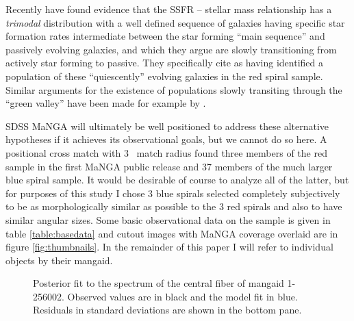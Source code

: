 \documentclass[modern]{aastex62}
\begin{document}
Recently \citet{2016arXiv161105932O} have found evidence that the SSFR -- stellar mass relationship has a \emph{trimodal} distribution with a well defined sequence of galaxies having specific star formation rates intermediate between the star forming ``main sequence'' and passively evolving galaxies, and which they argue are slowly transitioning from actively star forming to passive. They specifically cite  as having identified a population of these ``quiescently'' evolving galaxies in the red spiral sample. Similar arguments for the existence of populations slowly transiting through the ``green valley'' have been made for example by \citet{2015MNRAS.450..435S}.

SDSS MaNGA will ultimately be well positioned to address these alternative hypotheses if it achieves its observational goals, but we cannot do so here. A positional cross match with 3\arcsec~ match radius found three members of the red sample in the first MaNGA public release and 37 members of the much larger blue spiral sample. It would be desirable of course to analyze all of the latter, but for purposes of this study I chose 3 blue spirals selected completely subjectively to be as morphologically similar as possible to the 3 red spirals and also to have similar angular sizes. Some basic observational data on the sample is given in table \ref{table:basedata} and cutout images with MaNGA coverage overlaid are in figure \ref{fig:thumbnails}. In the remainder of this paper I will refer to individual objects by their mangaid.

\begin{figure}[ht]
\caption{Posterior fit to the spectrum of the central fiber of mangaid 1-256002. Observed values are in black and the model fit in blue. Residuals in standard deviations are shown in the bottom pane.}
\label{fig:specfit}
\end{figure}
\end{document}
